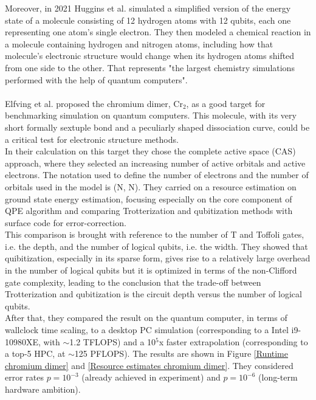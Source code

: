 Moreover, in 2021 Huggins et al. \cite{Huggins2022Mar} simulated a simplified version of the energy state of a molecule consisting of 12 hydrogen atoms with 12 qubits, each one representing one atom’s single electron. They then modeled a chemical reaction in a molecule containing hydrogen and nitrogen atoms, including how that molecule’s electronic structure would change when its hydrogen atoms shifted from one side to the other. That represents "the largest chemistry simulations performed with the help of quantum computers". \\
\\
Elfving et al. \cite{Elfving2020Sep} proposed the chromium dimer, Cr$_2$, as a good target for benchmarking simulation on quantum computers. This molecule, with its very short formally sextuple bond and a peculiarly shaped dissociation curve, could be a critical test for electronic structure methods. \\
In their calculation on this target they chose the complete active space (CAS) approach, where they selected an increasing number of active orbitals and active electrons. The notation used to define the number of electrons and the number of orbitals used in the model is (N, N). They carried on a resource estimation on ground state energy estimation, focusing especially on the core component of QPE algorithm and comparing Trotterization and qubitization methods with surface code for error-correction. \\
This comparison is brought with reference to the number of T and Toffoli gates, i.e. the depth, and the number of logical qubits, i.e. the width. They showed that quibitization, especially in its sparse form, gives rise to a relatively large overhead in the number of logical qubits but it is optimized in terms of the non-Clifford gate complexity, leading to the conclusion that the trade-off between Trotterization and qubitization is the circuit depth versus the number of logical qubits. \\
After that, they compared the result on the quantum computer, in terms of wallclock time scaling, to a desktop PC simulation (corresponding to a Intel i9-10980XE, with $\sim$1.2 TFLOPS) and a 10$^5$x faster extrapolation (corresponding to a top-5 HPC, at $\sim$125 PFLOPS). The results are shown in Figure \ref{Runtime chromium dimer} and \ref{Resource estimates chromium dimer}. They considered error rates $p=10^{-3}$ (already achieved in experiment) and $p=10^{-6}$ (long-term hardware ambition).
